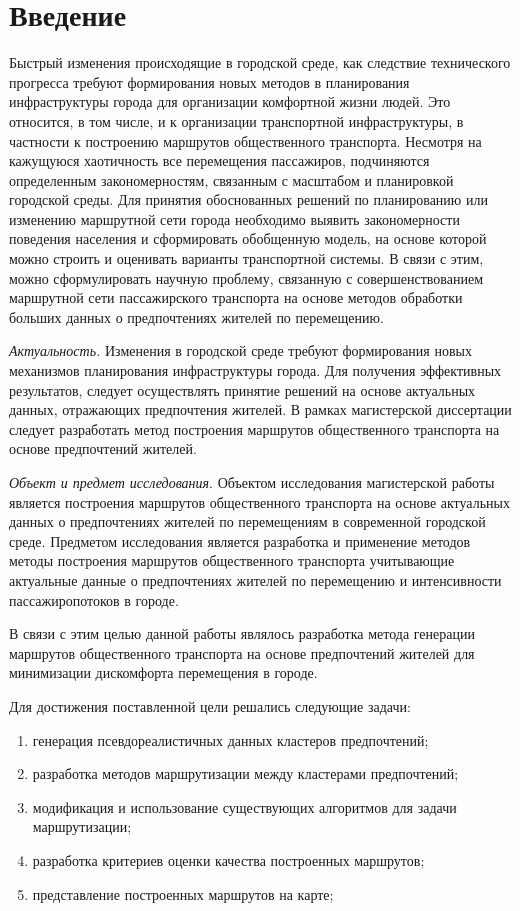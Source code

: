 \part{Введение}
Быстрый изменения происходящие в городской среде, как следствие технического прогресса требуют формирования 
новых методов в планирования инфраструктуры города для организации комфортной жизни людей. Это относится, в 
том числе, и к организации транспортной инфраструктуры, в частности к построению маршрутов общественного 
транспорта. Несмотря на кажущуюся хаотичность все перемещения пассажиров, подчиняются определенным 
закономерностям, связанным с масштабом и планировкой городской среды. Для принятия обоснованных решений по 
планированию или изменению маршрутной сети города необходимо выявить закономерности поведения населения и 
сформировать обобщенную модель, на основе которой можно строить и оценивать варианты транспортной системы. 
В связи с этим, можно сформулировать научную проблему, связанную с совершенствованием маршрутной сети 
пассажирского транспорта на основе методов обработки больших данных о предпочтениях жителей по перемещению. 

\emph{Актуальность.} Изменения в городской среде требуют формирования новых механизмов планирования 
инфраструктуры города. Для получения эффективных результатов, следует осуществлять принятие решений на основе 
актуальных данных, отражающих предпочтения жителей. В рамках магистерской диссертации следует разработать 
метод построения маршрутов общественного транспорта на основе предпочтений жителей.

\emph{Объект и предмет исследования}. Объектом исследования магистерской работы является построения маршрутов общественного транспорта на основе актуальных данных о предпочтениях жителей по перемещениям в современной 
городской среде. Предметом исследования является разработка и применение методов методы построения маршрутов общественного транспорта учитывающие актуальные данные о предпочтениях жителей по перемещению и интенсивности пассажиропотоков в городе.


В связи с этим целью данной работы являлось разработка метода генерации маршрутов общественного транспорта на 
основе предпочтений жителей для минимизации дискомфорта перемещения в городе.

Для достижения поставленной цели решались следующие задачи:
\vspace*{-1em}
\begin{enumerate}\itemsep-5pt
    \item генерация псевдореалистичных данных кластеров предпочтений;
    \item разработка методов маршрутизации между кластерами предпочтений;
    \item модификация и использование существующих алгоритмов для задачи маршрутизации;
    \item разработка критериев оценки качества построенных маршрутов;
    \item представление построенных маршрутов на карте;
\end{enumerate}

